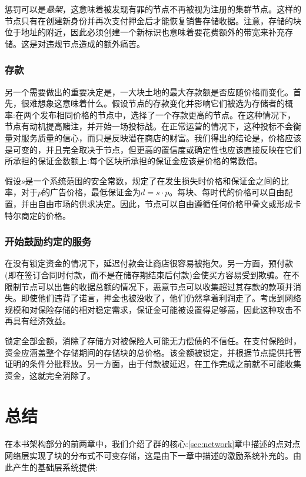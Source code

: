 惩罚可以是\emph{悬架}，这意味着被发现有罪的节点不再被视为注册的集群节点。这样的节点只有在创建新身份并再次支付押金后才能恢复销售存储收据。注意，存储的块位于地址的附近，因此必须创建一个新标识也意味着要花费额外的带宽来补充存储。这是对违规节点造成的额外痛苦。


\subsubsection{存款}

另一个需要做出的重要决定是，一大块土地的最大存款额是否应随价格而变化。首先，很难想象这意味着什么。假设节点的存款变化并影响它们被选为存储者的概率:在两个发布相同价格的节点中，选择了一个存款更高的节点。在这种情况下，节点有动机提高赌注，并开始一场投标战。在正常运营的情况下，这种投标不会衡量对服务质量的信心，而只是反映潜在商店的财富。我们得出的结论是，价格应该是可变的，并且完全取决于节点，但更高的置信度或确定性也应该直接反映在它们所承担的保证金数额上:每个区块所承担的保证金应该是价格的常数倍。

假设$s$是一个系统范围的安全常数，规定了在发生损失时价格和保证金之间的比率，对于$p$的广告价格，最低保证金为$d=s\cdot p$。每块、每时代的价格可以自由配置，并由自由市场的供求决定。因此，节点可以自由遵循任何价格甲骨文或形成卡特尔商定的价格。

\subsubsection{开始鼓励约定的服务}

在没有锁定资金的情况下，延迟付款会让商店很容易被拖欠。另一方面，预付款(即在签订合同时付款，而不是在储存期结束后付款)会使买方容易受到欺骗。在不限制节点可以出售的收据总额的情况下，恶意节点可以收集超过其存款的款项并消失。即使他们违背了诺言，押金也被没收了，他们仍然拿着利润走了。考虑到网络规模和对保险存储的相对稳定需求，保证金可能被设置得足够高，因此这种攻击不再具有经济效益。

锁定全部金额，消除了存储方对被保险人可能无力偿债的不信任。在支付保险时，资金应涵盖整个存储期间的存储块的总价格。该金额被锁定，并根据节点提供托管证明的条件分批释放。另一方面，由于付款被延迟，在工作完成之前就不可能收集资金，这就完全消除了。

\section{总结}


在本书架构部分的前两章中，我们介绍了群的核心:\ref{sec:network}章中描述的点对点网络层实现了块的分布式不可变存储，这是由下一章中描述的激励系统补充的。由此产生的基础层系统提供:

